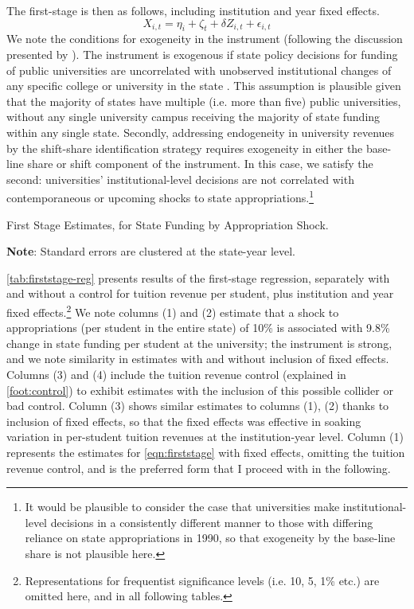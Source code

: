 The first-stage is then as follows, including institution and year fixed effects.
\begin{equation}
    \label{eqn:firststage}
    X_{i,t} = \eta_i + \zeta_t + \delta Z_{i,t} + \epsilon_{i,t}
\end{equation}
We note the conditions for exogeneity in the instrument (following the discussion presented by \citealt{NBERw27885}).
The instrument is exogenous if state policy decisions for funding of public universities are uncorrelated with unobserved institutional changes of any specific college or university in the state \citep{borusyak2022quasi}.
This assumption is plausible given that the majority of states have multiple (i.e. more than five) public universities, without any single university campus receiving the majority of state funding within any single state.
Secondly, addressing endogeneity in university revenues by the shift-share identification strategy requires exogeneity in either the base-line share or shift component of the instrument.
In this case, we satisfy the second: universities' institutional-level decisions are not correlated with contemporaneous or upcoming shocks to state appropriations.\footnote{
    It would be plausible to consider the case that universities make institutional-level decisions in a consistently different manner to those 
    with differing reliance on state appropriations in 1990, so that exogeneity by the base-line share is not plausible here.
}

\begin{table}[h!]
    \singlespacing
    \centering
    \caption{First Stage Estimates, for State Funding by Appropriation Shock.}
    \makebox[\textwidth][c]{}
    \label{tab:firststage-reg}
    \begin{flushleft}
        \footnotesize
        \textbf{Note}: Standard errors are clustered at the state-year level.
    \end{flushleft}
\end{table}

\autoref{tab:firststage-reg} presents results of the first-stage regression, separately with and without a control for tuition revenue per student, plus institution and year fixed effects.\footnote{
    Representations for frequentist significance levels (i.e. 10, 5, 1\% etc.) are omitted here, and in all following tables.
}
We note columns (1) and (2) estimate that a shock to appropriations (per student in the entire state) of 10\% is associated with 9.8\% change in state funding per student at the university; the instrument is strong, and we note similarity in estimates with and without inclusion of fixed effects.
Columns (3) and (4) include the tuition revenue control (explained in \autoref{foot:control}) to exhibit estimates with the inclusion of this possible collider or bad control.
Column (3) shows similar estimates to columns (1), (2) thanks to inclusion of fixed effects, so that the fixed effects was effective in soaking variation in per-student tuition revenues at the institution-year level.
Column (1) represents the estimates for \autoref{eqn:firststage} with fixed effects, omitting the tuition revenue control, and is the preferred form that I proceed with in the following.

